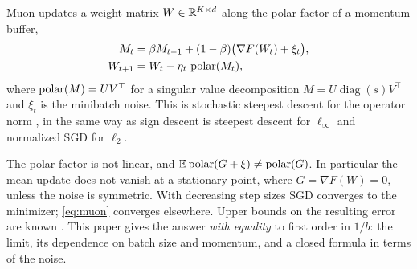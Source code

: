 \documentclass{article}
\theoremstyle{plain}
\theoremstyle{definition}
\theoremstyle{remark}
\begin{document}
Muon \citep{jordan2024muon} updates a weight matrix $W\in\mathbb{R}^{K\times d}$ along the polar factor of a momentum
buffer,
\begin{equation}\label{eq:muon}
\begin{aligned}
M_t&=\beta M_{t-1}+(1-\beta)\big(\nabla F(W_t)+\xi_t\big),\\
W_{t+1}&=W_t-\eta_t\,\operatorname{polar}(M_t),
\end{aligned}
\end{equation}
where $\operatorname{polar}(M)=UV^\top$ for a singular value decomposition $M=U\operatorname{diag}(s)V^\top$ and $\xi_t$ is the
minibatch noise. This is stochastic steepest descent for the operator norm \citep{bernstein2024old,carlson2015stochastic},
in the same way as sign descent is steepest descent for $\ell_\infty$ and normalized SGD for $\ell_2$.

The polar factor is not linear, and $\mathbb{E}\operatorname{polar}(G+\xi)\ne\operatorname{polar}(G)$. In particular the mean update does not vanish at a
stationary point, where $G=\nabla F(W)=0$, unless the noise is symmetric. With decreasing step sizes SGD converges to
the minimizer; \eqref{eq:muon} converges elsewhere. Upper bounds on the resulting error are known
\citep{xie2026muon,chen2026when,do2026muon}. This paper gives the answer \emph{with equality} to first order in $1/b$: the limit, its
dependence on batch size and momentum, and a closed formula in terms of the noise.
\end{document}
